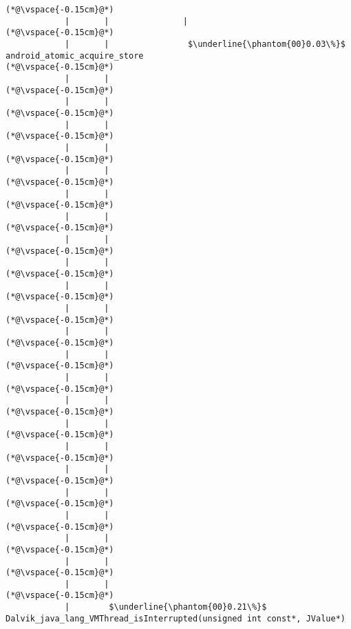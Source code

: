 \begin{lstlisting}[caption=20 viiteparametria Java$\to$C , label=profile:J2CBenchmark00206, numberbychapter=true, frame=lines, float, floatplacement=t]
(*@\vspace{-0.15cm}@*)
            |       |               |
(*@\vspace{-0.15cm}@*)
            |       |                $\underline{\phantom{00}0.03\%}$ android_atomic_acquire_store
(*@\vspace{-0.15cm}@*)
            |       |        
(*@\vspace{-0.15cm}@*)
            |       |        
(*@\vspace{-0.15cm}@*)
            |       |        
(*@\vspace{-0.15cm}@*)
            |       |        
(*@\vspace{-0.15cm}@*)
            |       |        
(*@\vspace{-0.15cm}@*)
            |       |        
(*@\vspace{-0.15cm}@*)
            |       |        
(*@\vspace{-0.15cm}@*)
            |       |        
(*@\vspace{-0.15cm}@*)
            |       |        
(*@\vspace{-0.15cm}@*)
            |       |        
(*@\vspace{-0.15cm}@*)
            |       |        
(*@\vspace{-0.15cm}@*)
            |       |        
(*@\vspace{-0.15cm}@*)
            |       |        
(*@\vspace{-0.15cm}@*)
            |       |        
(*@\vspace{-0.15cm}@*)
            |       |                
(*@\vspace{-0.15cm}@*)
            |       |                
(*@\vspace{-0.15cm}@*)
            |       |                
(*@\vspace{-0.15cm}@*)
            |       |                
(*@\vspace{-0.15cm}@*)
            |       |                
(*@\vspace{-0.15cm}@*)
            |       |                
(*@\vspace{-0.15cm}@*)
            |       |
(*@\vspace{-0.15cm}@*)
            |       |
(*@\vspace{-0.15cm}@*)
            |       |
(*@\vspace{-0.15cm}@*)
            |        $\underline{\phantom{00}0.21\%}$ Dalvik_java_lang_VMThread_isInterrupted(unsigned int const*, JValue*)

\end{lstlisting}
